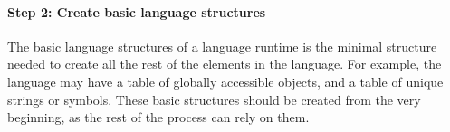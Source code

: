 \paragraph{\textbf{Step 2: Create basic language structures}}

The basic language structures of a language runtime is the minimal structure needed to create all the rest of the elements in the language. For example, the language may have a table of globally accessible objects, and a table of unique strings or symbols. These basic structures should be created from the very beginning, as the rest of the process can rely on them.
%
%
%
%

